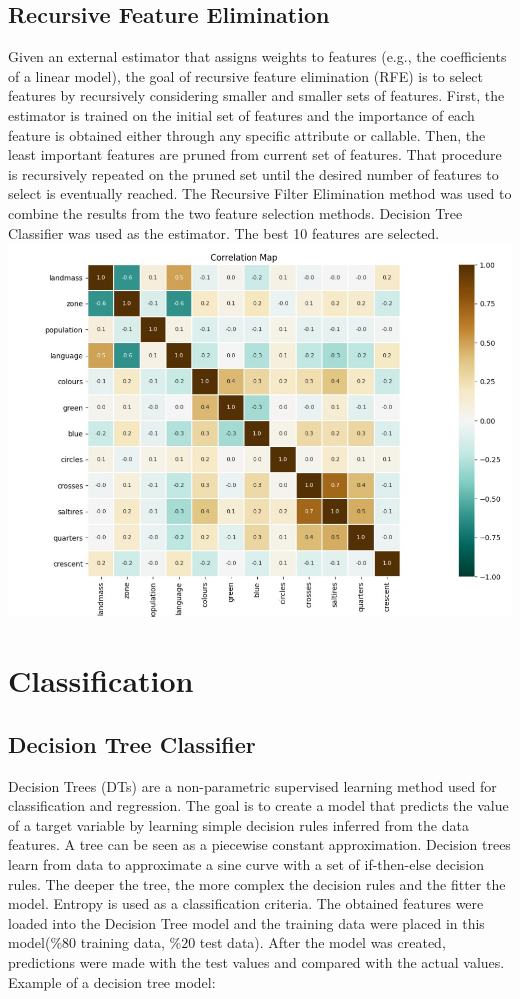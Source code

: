 \documentclass[conference]{IEEEtran}
\begin{document}
\subsection{Recursive Feature Elimination}
Given an external estimator that assigns weights to features (e.g., the coefficients of a linear model), the goal of recursive feature elimination (RFE) is to select features by recursively considering smaller and smaller sets of features. First, the estimator is trained on the initial set of features and the importance of each feature is obtained either through any specific attribute or callable. Then, the least important features are pruned from current set of features. That procedure is recursively repeated on the pruned set until the desired number of features to select is eventually reached.\cite{b5}
The Recursive Filter Elimination method was used to combine the results from the two feature selection methods. Decision Tree Classifier was used as the estimator. The best 10 features are selected.\\
\includegraphics[scale=0.35]{corr.jpg}

\section{Classification}
\subsection{Decision Tree Classifier}
Decision Trees (DTs) are a non-parametric supervised learning method used for classification and regression. The goal is to create a model that predicts the value of a target variable by learning simple decision rules inferred from the data features. A tree can be seen as a piecewise constant approximation.\cite{b6}
Decision trees learn from data to approximate a sine curve with a set of if-then-else decision rules. The deeper the tree, the more complex the decision rules and the fitter the model. Entropy is used as a classification criteria. The obtained features were loaded into the Decision Tree model and the training data were placed in this model($\%80$ training data, $\%20$ test data). After the model was created, predictions were made with the test values and compared with the actual values. Example of a decision tree model:
\end{document}
